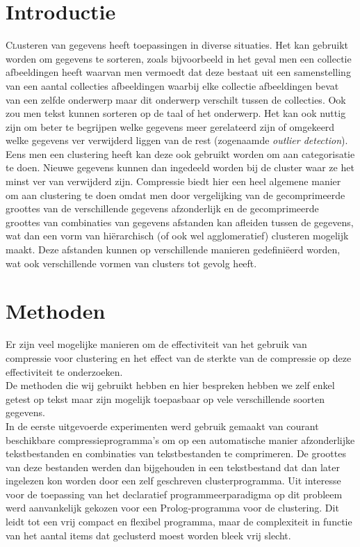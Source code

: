 \documentclass[twoside]{article}
\begin{document}
\begin{multicols}{2} %

\section{Introductie}

\lettrine[nindent=0em,lines=3]{C} lusteren van gegevens heeft toepassingen in diverse 
situaties. 
Het kan gebruikt worden om gegevens te sorteren, zoals bijvoorbeeld in het geval men
een collectie afbeeldingen heeft waarvan men vermoedt dat deze bestaat uit een 
samenstelling van een aantal collecties afbeeldingen waarbij elke collectie afbeeldingen
bevat van een zelfde onderwerp maar dit onderwerp verschilt tussen de collecties.
Ook zou men tekst kunnen sorteren op de taal of het onderwerp.
Het kan ook nuttig zijn om beter te begrijpen welke gegevens meer gerelateerd zijn of 
omgekeerd welke gegevens ver verwijderd liggen van de rest (zogenaamde \emph{outlier 
detection}).
Eens men een clustering heeft kan deze ook gebruikt worden om aan categorisatie te doen.
Nieuwe gegevens kunnen dan ingedeeld worden bij de cluster waar ze het minst ver van 
verwijderd zijn.
Compressie biedt hier een heel algemene manier om aan clustering te doen omdat men door
vergelijking van de gecomprimeerde groottes van de verschillende gegevens afzonderlijk 
en de gecomprimeerde groottes van combinaties van gegevens afstanden kan afleiden tussen
de gegevens, wat dan een vorm van hi\"erarchisch (of ook wel agglomeratief) clusteren
mogelijk maakt. Deze afstanden kunnen op verschillende manieren gedefini\"eerd worden,
wat ook verschillende vormen van clusters tot gevolg heeft.


\section{Methoden}

Er zijn veel mogelijke manieren om de effectiviteit van het gebruik van compressie voor
clustering en het effect van de sterkte van de compressie op deze effectiviteit te
onderzoeken.
\\
De methoden die wij gebruikt hebben en hier bespreken hebben we zelf enkel getest op tekst
maar zijn mogelijk toepasbaar op vele verschillende soorten gegevens.
\\
In de eerste uitgevoerde experimenten werd gebruik gemaakt van courant beschikbare 
compressieprogramma's om op een automatische manier afzonderlijke tekstbestanden en 
combinaties van tekstbestanden te comprimeren. De groottes van deze bestanden werden dan
bijgehouden in een tekstbestand dat dan later ingelezen kon worden door een zelf geschreven
clusterprogramma.
Uit interesse voor de toepassing van het declaratief programmeerparadigma op dit probleem
werd aanvankelijk gekozen voor een Prolog-programma voor de clustering.
Dit leidt tot een vrij compact en flexibel programma, maar de complexiteit in functie van 
het aantal items dat geclusterd moest worden bleek vrij slecht.
\begin{compactitem}


\end{compactitem}
\end{multicols}
\end{document}
